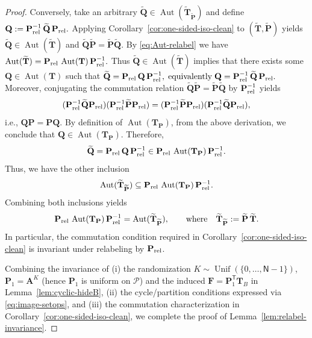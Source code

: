 \documentclass[onecolumn]{IEEEtran} %
\newcommand{\bA}{\mathbf A}
\newcommand{\bP}{\mathbf P}
\newcommand{\bF}{\mathbf F}
\newcommand{\bQ}{\mathbf Q}
\newcommand{\1}{\mathbbm{1}}
\DeclareMathOperator{\Aut}{Aut}
\theoremstyle{boldremark}
\newcommand{\bT}{\mathbf{T}}
\DeclareMathOperator{\Unif}{Unif}
\begin{document}
\begin{proof}
Conversely, take an arbitrary $\widetilde{\bQ}\in\Aut(\widetilde{\bT}_{\widetilde{\bP}})$ and define
$\bQ := \bP_{\rm rel}^{-1}\,\widetilde{\bQ}\,\bP_{\rm rel}.$
Applying Corollary~\ref{cor:one-sided-iso-clean} to $(\widetilde{\bT},\widetilde{\bP})$ yields
$\widetilde{\bQ}\in\Aut(\widetilde{\bT})$ and $\widetilde{\bQ}\widetilde{\bP}=\widetilde{\bP}\widetilde{\bQ}$.
By \eqref{eq:Aut-relabel} we have $\Aut(\widetilde{\bT})=\bP_{\rm rel}\,\Aut(\bT)\,\bP_{\rm rel}^{-1}.$
Thus $\widetilde{\bQ}\in\Aut(\widetilde{\bT})$ implies that there exists some
$\bQ\in\Aut(\bT)$ such that $\widetilde{\bQ}=\bP_{\rm rel}\,\bQ\,\bP_{\rm rel}^{-1},
\;\text{equivalently}\; \bQ=\bP_{\rm rel}^{-1}\,\widetilde{\bQ}\,\bP_{\rm rel}.$
Moreover, conjugating the commutation relation
$\widetilde{\bQ}\widetilde{\bP}=\widetilde{\bP}\widetilde{\bQ}$ by $\bP_{\rm rel}^{-1}$ yields
\[
(\bP_{\rm rel}^{-1}\widetilde{\bQ}\bP_{\rm rel})(\bP_{\rm rel}^{-1}\widetilde{\bP}\bP_{\rm rel})
=
(\bP_{\rm rel}^{-1}\widetilde{\bP}\bP_{\rm rel})(\bP_{\rm rel}^{-1}\widetilde{\bQ}\bP_{\rm rel}),
\]
i.e., $\bQ\bP=\bP\bQ$. By definition of $\Aut(\bT_{\bP})$, from the above derivation, we conclude that $\bQ\in\Aut(\bT_{\bP})$. Therefore,
\[
\widetilde{\bQ}=\bP_{\rm rel}\,\bQ\,\bP_{\rm rel}^{-1}
\in
\bP_{\rm rel}\,\Aut(\bT_{\bP})\,\bP_{\rm rel}^{-1}.
\]
Thus, we have the other inclusion
\[
\Aut(\widetilde{\bT}_{\widetilde{\bP}})
\subseteq
\bP_{\rm rel}\,\Aut(\bT_{\bP})\,\bP_{\rm rel}^{-1}.
\]
Combining both inclusions yields
\[
\bP_{\rm rel}\,\Aut(\bT_{\bP})\,\bP_{\rm rel}^{-1}
=
\Aut(\widetilde{\bT}_{\widetilde{\bP}}),
\qquad\text{where}\quad
\widetilde{\bT}_{\widetilde{\bP}}:=\widetilde{\bP}\,\widetilde{\bT}.
\]
In particular, the commutation condition required in Corollary~\ref{cor:one-sided-iso-clean} is invariant under relabeling by $\bP_{\rm rel}$.

Combining the invariance of (i) the randomization \(K\sim\Unif(\{0,\dots,\textsf{N}-1\})\), \(\bP_1=\bA^{K}\) (hence \(\bP_1\) is uniform on \(\mathcal{P}\)) and the induced \(\bF=\bP_1^{\mathsf T}\bT_{B}\) in Lemma~\ref{lem:cyclic-hideB},
(ii) the cycle/partition conditions expressed via \eqref{eq:image-setops}, and
(iii) the commutation characterization in Corollary~\ref{cor:one-sided-iso-clean}, we
complete the proof of Lemma~\ref{lem:relabel-invariance}.
\end{proof}
\end{document}
